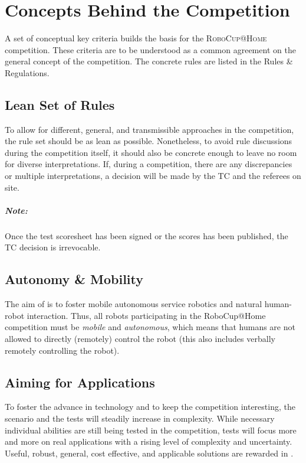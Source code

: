 \chapter{Concepts Behind the Competition}
\label{chap:concepts}

A set of conceptual key criteria builds the basis for the \textsc{RoboCup@Home} competition.
These criteria are to be understood as a common agreement on the general concept of the competition.
The concrete rules are listed in the \AtHome{} Rules \& Regulations.

\section{Lean Set of Rules}
\label{concept:lean_set_of_rules}

To allow for different, general, and transmissible approaches in the \AtHome{} competition, the rule set should be as lean as possible.
Nonetheless, to avoid rule discussions during the competition itself, it should also be concrete enough to leave no room for diverse interpretations.
If, during a competition, there are any discrepancies or multiple interpretations, a decision will be made by the TC and the referees on site.

\paragraph*{Note:} Once the test scoresheet has been signed or the scores has been published, the TC decision is irrevocable.

\section{Autonomy \& Mobility}
\label{concept:autonomy_and_mobility}

The aim of \AtHome{} is to foster mobile autonomous service robotics and natural human-robot interaction.
Thus, all robots participating in the RoboCup@Home competition must be \emph{mobile} and \emph{autonomous}, which means that humans are not allowed to directly (remotely) control the robot (this also includes verbally remotely controlling the robot).

\section{Aiming for Applications}
\label{concept:aiming_for_applications}

To foster the advance in technology and to keep the competition interesting, the scenario and the tests will steadily increase in complexity.
While necessary individual abilities are still being tested in the competition, tests will focus more and more on real applications with a rising level of complexity and uncertainty.
Useful, robust, general, cost effective, and applicable solutions are rewarded in \AtHome.

